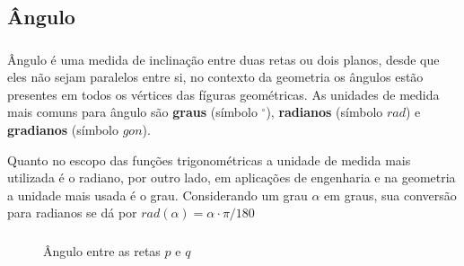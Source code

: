 \documentclass[handout]{beamer}
\begin{document}
\subsection{Ângulo}

\begin{frame}\frametitle{\subsecname}
    Ângulo é uma medida de inclinação entre duas retas ou dois planos, desde que eles não sejam paralelos entre si, no
    contexto da geometria os ângulos estão presentes em todos os vértices das fíguras geométricas.
    As unidades de medida mais comuns para ângulo são \textbf{graus} (símbolo $^{\circ}$), \textbf{radianos} (símbolo $rad$) e \textbf{gradianos} (símbolo $gon$).

    Quanto no escopo das funções trigonométricas a unidade de medida mais utilizada é o radiano, por outro lado,
    em aplicações de engenharia e na geometria a unidade mais usada é o grau. Considerando um grau $\alpha$ em graus,
    sua conversão para radianos se dá por $rad(\alpha) = \alpha\cdot\pi/180$

\end{frame}


\begin{frame}[fragile]\frametitle{\subsecname}
    \begin{figure}[H]
        \centering
        \caption{Ângulo entre as retas $p$ e $q$}
    \end{figure}
\end{frame}

\end{document}

